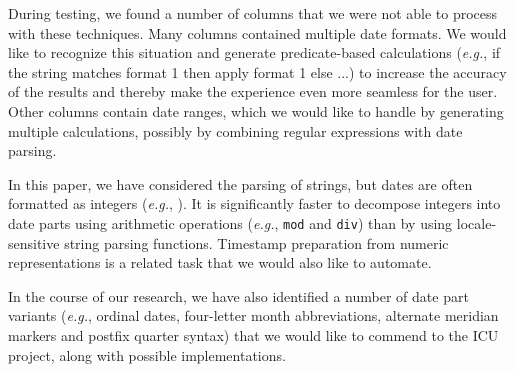During testing, we found a number of columns that we were not able to process with these techniques. Many columns contained multiple date formats. We would like to recognize this situation and generate predicate-based calculations (\textit{e.g.}, if the string matches format 1 then apply format 1 else ...) to increase the accuracy of the results and thereby make the experience even more seamless for the user. Other columns contain date ranges, which we would like to handle by generating multiple calculations, possibly by combining regular expressions with date parsing.

In this paper, we have considered the parsing of strings, but dates are often formatted as integers (\textit{e.g.}, ). 
It is significantly faster to decompose integers into date parts using arithmetic operations (\textit{e.g.}, \texttt{mod} and \texttt{div}) than by using locale-sensitive string parsing functions. 
Timestamp preparation from numeric representations is a related task that we would also like to automate.

In the course of our research, we have also identified a number of date part variants (\textit{e.g.}, ordinal dates, four-letter month abbreviations, alternate meridian markers and postfix quarter syntax) that we would like to commend to the ICU project, along with possible implementations.
